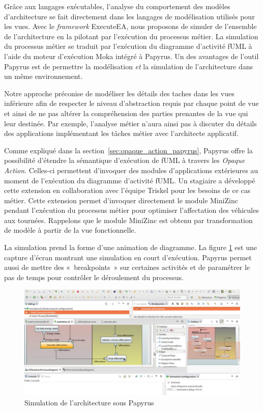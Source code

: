 Grâce aux langages exécutables, l'analyse du comportement des modèles
d'architecture se fait directement dans les langages de modélisation utilisés
pour les vues. Avec le \emph{framework} ExecuteEA, nous proposons de simuler de
l'ensemble de l'architecture en la pilotant par l'exécution du processus métier.
La simulation du processus métier se traduit par l'exécution du diagramme
d'activité fUML à l'aide du moteur d'exécution Moka intégré à Papyrus. Un des
avantages de l'outil Papyrus est de permettre la modélisation \emph{et} la
simulation de l'architecture dans un même environnement.

Notre approche préconise de modéliser les détails des taches dans les vues
inférieure afin de respecter le niveau d'abstraction requis par chaque point de
vue et ainsi de ne pas altérer la compréhension des parties prenantes de la vue
qui leur destinée. Par exemple, l'analyse métier n'aura ainsi pas à discuter du
détails des applications implémentant les tâches métier avec l'architecte
applicatif.

Comme expliqué dans la section~\ref{sec:opaque_action_papyrus}, Papyrus offre la
possibilité d'étendre la sémantique d'exécution de fUML à travers les
\emph{Opaque Action}. Celles-ci permettent d'invoquer des modules d'applications
extérieures au moment de l'exécution du diagramme d'activité fUML. Un stagiaire
a développé cette extension en collaboration avec l'équipe Triskel pour les
besoins de ce cas métier. Cette extension permet d'invoquer directement le
module MiniZinc pendant l’exécution du processus métier pour optimiser
l'affectation des véhicules aux tournées. Rappelons que le module MiniZinc est
obtenu par transformation de modèle à partir de la vue fonctionnelle.

La simulation prend la forme d'une animation de diagramme. La figure
\ref{fig:simu_capture_ecran} est une capture d'écran montrant une simulation en
court d'exécution. Papyrus permet aussi de mettre des «~breakpoints~» sur
certaines activités et de paramétrer le pas de temps pour contrôler le
déroulement du processus.

\begin{figure}[!htbp]
 \begin{center}
  \includegraphics[angle=90, width=1\textwidth]{figures/5_implementation/simu_capture_ecran.png}
 \end{center}
 \caption{Simulation de l'architecture sous Papyrus}
 \label{fig:simu_capture_ecran}
\end{figure}

